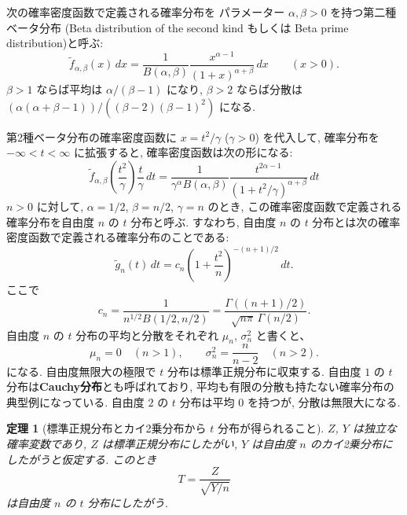 \documentclass[12pt,twoside]{jarticle}
\newcommand\tf{{\tilde f}}
\newcommand\tg{{\tilde g}}
\theoremstyle{jplain}
\newtheorem{theorem}{定理}
\theoremstyle{jplain}
\theoremstyle{jplain}
\numberwithin{theorem}{section}
\numberwithin{equation}{section}
\numberwithin{figure}{section}
\numberwithin{table}{section}
\begin{document}
次の確率密度函数で定義される確率分布を
パラメーター $\alpha,\beta>0$ を持つ第二種ベータ分布
(Beta distribution of the second kind もしくは Beta prime distribution)と呼ぶ:
\[
\tf_{\alpha,\beta}(x)\,dx
=\frac{1}{B(\alpha,\beta)}\frac{x^{\alpha-1}}{(1+x)^{\alpha+\beta}}\,dx
\qquad (x>0).
\]
$\beta>1$ ならば平均は $\alpha/(\beta-1)$ になり, 
$\beta>2$ ならば分散は $(\alpha(\alpha+\beta-1))/((\beta-2)(\beta-1)^2)$ になる.

第2種ベータ分布の確率密度函数に $x=t^2/\gamma$ ($\gamma>0$) を代入して, 
確率分布を $-\infty<t<\infty$ に拡張すると, 確率密度函数は次の形になる: 
\[
\tf_{\alpha,\beta}\left(\frac{t^2}{\gamma}\right)\frac{t}{\gamma}\,dt
=\frac{1}{\gamma^\alpha B(\alpha,\beta)}\frac{t^{2\alpha-1}}{(1+t^2/\gamma)^{\alpha+\beta}}\,dt
\]
$n>0$ に対して, 
$\alpha=1/2$, $\beta=n/2$, $\gamma=n$ のとき, この確率密度函数で定義される
確率分布を自由度 $n$ の $t$ 分布と呼ぶ.
すなわち, 自由度 $n$ の $t$ 分布とは次の確率密度函数で定義される確率分布のことである:
\[
\tg_n(t)\,dt = c_n\left( 1+\frac{t^2}{n} \right)^{-(n+1)/2}\,dt.
\]
ここで
\[
c_n
=\frac{1}{n^{1/2}B(1/2,n/2)}
=\frac{\Gamma((n+1)/2)}{\sqrt{n\pi}\,\Gamma(n/2)}.
\]
自由度 $n$ の $t$ 分布の平均と分散をそれぞれ $\mu_n$, $\sigma_n^2$ と書くと、
\[
\mu_n = 0 \quad (n>1), \qquad
\sigma_n^2 = \frac{n}{n-2} \quad (n>2).
\]
になる.  自由度無限大の極限で $t$ 分布は標準正規分布に収束する.
自由度 $1$ の $t$ 分布は{\bf Cauchy分布}とも呼ばれており, 
平均も有限の分散も持たない確率分布の典型例になっている.
自由度 $2$ の $t$ 分布は平均 $0$ を持つが, 分散は無限大になる.

\begin{theorem}[標準正規分布とカイ2乗分布から $t$ 分布が得られること]
\label{theorem:t}
$Z$, $Y$ は独立な確率変数であり, 
$Z$ は標準正規分布にしたがい, 
$Y$ は自由度 $n$ のカイ2乗分布にしたがうと仮定する.
このとき
\[
T = \frac{Z}{\sqrt{Y/n}}
\]
は自由度 $n$ の $t$ 分布にしたがう.
\end{theorem}
\end{document}
